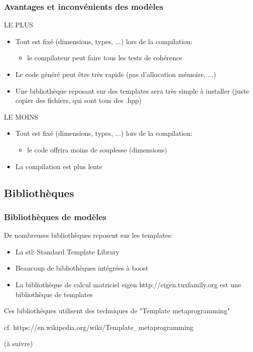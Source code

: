 \documentclass{beamer}
\begin{document}
\begin{frame}
\frametitle {Avantages et inconvénients des modèles}

\begin{block}{LE PLUS}
\begin{itemize}
\item{Tout est fixé (dimensions, types, ...) lors de la compilation:\begin{itemize}\item{le compilateur peut faire tous les tests de cohérence}\end{itemize} }
\item{Le code généré peut être très rapide (pas d'allocation mémoire, ...)}
\item{Une bibliothèque reposant sur des templates sera très simple à installer (juste copier des fichiers, qui sont tous des .hpp)}
\end{itemize}
\end{block}

\begin{block}{LE MOINS}
\begin{itemize}
\item{Tout est fixé (dimensions, types, ...) lors de la compilation:\begin{itemize}\item{le code offrira moins de souplesse (dimensions)}\end{itemize} }
\item{La compilation est plus lente}
\end{itemize}
\end{block}

\end{frame}

\subsection{Bibliothèques}

\begin{frame}
\frametitle {Bibliothèques de modèles}
De nombreuses bibliothèques reposent sur les templates:
\begin{itemize}
\item{La stl: Standard Template Library}
\item{Beaucoup de bibliothèques intégrées à boost}
\item{La bibliothèque de calcul matriciel eigen http://eigen.tuxfamily.org est une bibliothèque de templates}
\end{itemize}
Ces bibliothèques utilisent des techniques de "Template metaprogramming"

cf. https://en.wikipedia.org/wiki/Template\_metaprogramming

\end{frame}

\begin{frame}
(à suivre)
\end{frame}
\end{document}
